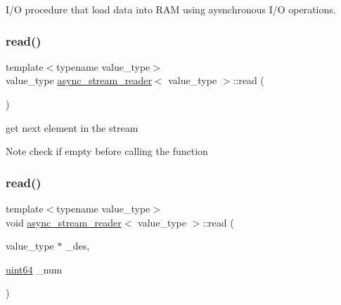 I/O procedure that load data into R\+AM using aysnchronous I/O operations. 

\mbox{\label{classasync__stream__reader_abb382de67d33724ff4fea6714fc67ac8}} 
\subsubsection{\texorpdfstring{read()}{read()}\hspace{0.1cm}{\footnotesize\ttfamily [1/2]}}
{\footnotesize\ttfamily template$<$typename value\+\_\+type$>$ \\
value\+\_\+type \hyperlink{classasync__stream__reader}{async\+\_\+stream\+\_\+reader}$<$ value\+\_\+type $>$\+::read (\begin{DoxyParamCaption}{ }\end{DoxyParamCaption})\hspace{0.3cm}{\ttfamily [inline]}}



get next element in the stream 

\begin{DoxyNote}{Note}
check if empty before calling the function 
\end{DoxyNote}
\mbox{\label{classasync__stream__reader_ac441a02e7bb4708948552ce7ced4e9d4}} 
\subsubsection{\texorpdfstring{read()}{read()}\hspace{0.1cm}{\footnotesize\ttfamily [2/2]}}
{\footnotesize\ttfamily template$<$typename value\+\_\+type$>$ \\
void \hyperlink{classasync__stream__reader}{async\+\_\+stream\+\_\+reader}$<$ value\+\_\+type $>$\+::read (\begin{DoxyParamCaption}\item[{value\+\_\+type $\ast$}]{\+\_\+des,  }\item[{\hyperlink{types_8h_a60e8696a4678cd348e991a1f172e53f7}{uint64}}]{\+\_\+num }\end{DoxyParamCaption})\hspace{0.3cm}{\ttfamily [inline]}}




